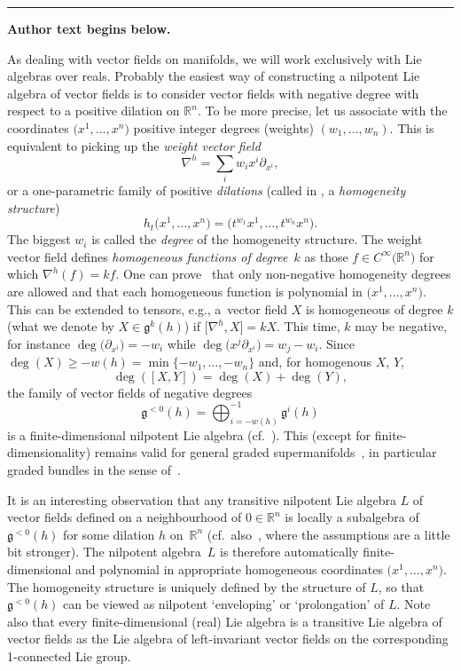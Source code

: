 \documentclass[11pt]{article}
\numberwithin{equation}{section}
\numberwithin{equation}{section}
\begin{document}
\medskip\hrule\medskip\noindent\textbf{Author text begins below.}\par
\setcounter{section}{1}
As dealing with vector fields on manifolds, we will work exclusively with Lie algebras over reals.
Probably the easiest way of constructing a nilpotent Lie algebra of vector fields is to consider vector fields with negative degree with respect to a positive dilation on ${\mathbb R}^n$. To be more precise, let us associate with the coordinates $\big(x^1,\dots,x^n\big)$ positive integer degrees (weights) $(w_1,\dots,w_n)$. This is equivalent to picking up
the \emph{weight vector field}
\[
\nabla^h=\sum_iw_ix^i\partial_{x^i} ,
\] or a one-parametric family of positive \emph{dilations} (called in \cite{Bruce:16, Grabowski:2006,Grabowski:2012}, a \emph{homogeneity structure})
\[
h_t\big(x^1,\dots,x^n\big)=\big(t^{w_1}x^1,\dots,t^{w_n}x^n\big) .
\]
The biggest $w_i$ is called the \emph{degree} of the homogeneity structure. The weight vector field defines \emph{homogeneous functions of degree~$k$} as those $f\in C^\infty\big({\mathbb R}^n\big)$
for which $\nabla^h(f)=kf$. One can prove~\cite{Grabowski:2012} that only non-negative homogeneity degrees are allowed and that each homogeneous function is polynomial in $\big(x^1,\dots,x^n\big)$. This can be extended to tensors, e.g., a~vector field $X$ is homogeneous of degree $k$ (what we denote by $X\in\mathfrak{g}^k(h)$) if $\big[\nabla^h,X\big]=kX$. This time, $k$ may be negative, for instance $\deg\big(\partial_{x^i}\big)=-w_i$ while $\deg\big(x^j\partial_{x^i}\big)=w_j-w_i$.
Since $\deg(X)\ge -w(h)=\min\{-w_1,\dots,-w_n\}$ and, for homogenous $X$, $Y$,
\[ \deg([X,Y])=\deg(X)+\deg(Y) ,\]
the family of vector fields of negative degrees
\[ \mathfrak{g}^{<0}(h)=\bigoplus_{i=-w(h)}^{-1}\mathfrak{g}^i(h)\]
is a finite-dimensional nilpotent Lie algebra (cf.~\cite{JG90,MK88}).
This (except for finite-dimensionality) remains valid for general graded supermanifolds~\cite{Voronov10}, in particular graded bundles in the sense of~\cite{Grabowski:2012}.

It is an interesting observation that any transitive nilpotent Lie algebra $L$ of vector fields defined on a neighbourhood of $0\in{\mathbb R}^n$ is locally a subalgebra of $\mathfrak{g}^{<0}(h)$ for some dilation $h$ on~${\mathbb R}^n$ \cite{JG90} (cf.\ also~\cite{MK88}, where the assumptions are a little bit stronger). The nilpotent algebra~$L$ is therefore automatically finite-dimensional and polynomial in appropriate homogeneous coordinates $\big(x^1,\dots,x^n\big)$. The homogeneity structure is uniquely defined by the structure of $L$, so that $\mathfrak{g}^{<0}(h)$ can be viewed as nilpotent `enveloping' or `prolongation' of $L$. Note also that every finite-dimensional (real) Lie algebra is a transitive Lie algebra of vector fields as the Lie algebra of left-invariant vector fields on the corresponding 1-connected Lie group.
\end{document}
